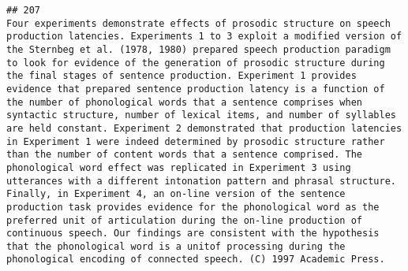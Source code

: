 \documentclass[
  english,
  man]{apa6}
\begin{document}
\begin{verbatim}
## 207                                                                                                                                                                                                                                                                                                                                                                                                                                                                                                                                                                                                                                                                                                                                                                                                                                                                                                                                                                                                                                                                                                                                                                                                                                                                                                                                                         Four experiments demonstrate effects of prosodic structure on speech production latencies. Experiments 1 to 3 exploit a modified version of the Sternbeg et al. (1978, 1980) prepared speech production paradigm to look for evidence of the generation of prosodic structure during the final stages of sentence production. Experiment 1 provides evidence that prepared sentence production latency is a function of the number of phonological words that a sentence comprises when syntactic structure, number of lexical items, and number of syllables are held constant. Experiment 2 demonstrated that production latencies in Experiment 1 were indeed determined by prosodic structure rather than the number of content words that a sentence comprised. The phonological word effect was replicated in Experiment 3 using utterances with a different intonation pattern and phrasal structure. Finally, in Experiment 4, an on-line version of the sentence production task provides evidence for the phonological word as the preferred unit of articulation during the on-line production of continuous speech. Our findings are consistent with the hypothesis that the phonological word is a unitof processing during the phonological encoding of connected speech. (C) 1997 Academic Press.

\end{verbatim}
\end{document}
